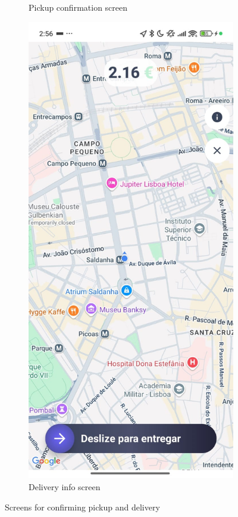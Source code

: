 \begin{figure}[H]
\begin{subfigure}[b]{0.48\textwidth}
        \caption{Pickup confirmation screen}
        \label{fig:pickup_order}
    \end{subfigure}
    \hfill
    \begin{subfigure}[b]{0.48\textwidth}
        \centering
        \includegraphics[width=\textwidth]{images/deliver_order_screen.jpeg}
        \caption{Delivery info screen}
        \label{fig:deliver_order}
    \end{subfigure}
    \caption{Screens for confirming pickup and delivery}
    \label{fig:courier_pickup_deliver}
\end{figure}

